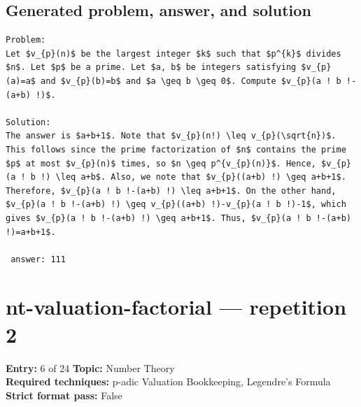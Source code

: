 \documentclass[11pt]{article}
\begin{document}
\subsection*{Generated problem, answer, and solution}
\begin{lstlisting}[style=modeloutput]
Problem:
Let $v_{p}(n)$ be the largest integer $k$ such that $p^{k}$ divides $n$. Let $p$ be a prime. Let $a, b$ be integers satisfying $v_{p}(a)=a$ and $v_{p}(b)=b$ and $a \geq b \geq 0$. Compute $v_{p}(a ! b !-(a+b) !)$.

Solution:
The answer is $a+b+1$. Note that $v_{p}(n!) \leq v_{p}(\sqrt{n})$. This follows since the prime factorization of $n$ contains the prime $p$ at most $v_{p}(n)$ times, so $n \geq p^{v_{p}(n)}$. Hence, $v_{p}(a ! b !) \leq a+b$. Also, we note that $v_{p}((a+b) !) \geq a+b+1$. Therefore, $v_{p}(a ! b !-(a+b) !) \leq a+b+1$. On the other hand, $v_{p}(a ! b !-(a+b) !) \geq v_{p}((a+b) !)-v_{p}(a ! b !)-1$, which gives $v_{p}(a ! b !-(a+b) !) \geq a+b+1$. Thus, $v_{p}(a ! b !-(a+b) !)=a+b+1$.

 answer: 111
\end{lstlisting}
\clearpage
\section{nt-valuation-factorial --- repetition 2}
\begin{minipage}{\textwidth}
\color{metadata}\small\raggedright
\textbf{Entry:} 6 of 24\quad
\textbf{Topic:} Number Theory\\[2pt]
\textbf{Required techniques:} p-adic Valuation Bookkeeping, Legendre's Formula\\[2pt]
\textbf{Strict format pass:} False
\end{minipage}
\end{document}
